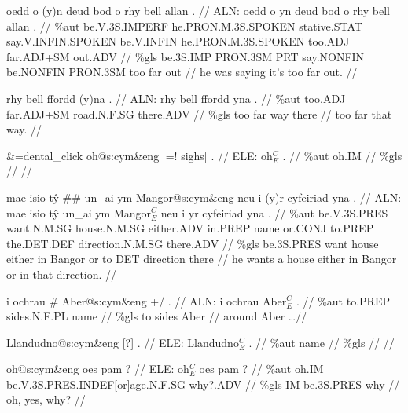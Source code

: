 \documentclass[a4paper,10pt]{article}
\begin{document}
\ex
\begingl[lingstyle=gergl]
\glchat oedd o (y)n deud bod o rhy bell allan . //
\glsurface ALN:  oedd o yn deud bod o rhy bell allan .  //
\glauto \%aut  be{\scriptsize .V.3S.IMPERF} he{\scriptsize .PRON.M.3S.SPOKEN} stative{\scriptsize .STAT} say{\scriptsize .V.INFIN.SPOKEN} be{\scriptsize .V.INFIN} he{\scriptsize .PRON.M.3S.SPOKEN} too{\scriptsize .ADJ} far{\scriptsize .ADJ+SM} out{\scriptsize .ADV}   //
\glmanual \%gls  be{\scriptsize .3S.IMP} PRON{\scriptsize .3SM} PRT say{\scriptsize .NONFIN} be{\scriptsize .NONFIN} PRON{\scriptsize .3SM} too far out   //
\gleng he was saying it's too far out. //
\endgl
\xe

\ex
\begingl[lingstyle=gergl]
\glchat rhy bell ffordd (y)na . //
\glsurface ALN:  rhy bell ffordd yna .  //
\glauto \%aut  too{\scriptsize .ADJ} far{\scriptsize .ADJ+SM} road{\scriptsize .N.F.SG} there{\scriptsize .ADV}   //
\glmanual \%gls  too far way there   //
\gleng too far that way. //
\endgl
\xe

\ex
\begingl[lingstyle=gergl]
\glchat \&=dental\_click oh@s:cym\&eng [=! sighs] . //
\glsurface ELE:  oh$^{C}_{E}$ .  //
\glauto \%aut  oh{\scriptsize .IM}   //
\glmanual \%gls     //
\gleng  //
\endgl
\xe

\ex
\begingl[lingstyle=gergl]
\glchat mae isio tŷ \#\# un\_ai ym Mangor@s:cym\&eng neu i (y)r cyfeiriad yna . //
\glsurface ALN:  mae isio tŷ un\_ai ym Mangor$^{C}_{E}$ neu i yr cyfeiriad yna .  //
\glauto \%aut  be{\scriptsize .V.3S.PRES} want{\scriptsize .N.M.SG} house{\scriptsize .N.M.SG} either{\scriptsize .ADV} in{\scriptsize .PREP} name or{\scriptsize .CONJ} to{\scriptsize .PREP} the{\scriptsize .DET.DEF} direction{\scriptsize .N.M.SG} there{\scriptsize .ADV}   //
\glmanual \%gls  be{\scriptsize .3S.PRES} want house either in Bangor or to DET direction there   //
\gleng he wants a house either in Bangor or in that direction. //
\endgl
\xe

\ex
\begingl[lingstyle=gergl]
\glchat i ochrau \# Aber@s:cym\&eng +/ . //
\glsurface ALN:  i ochrau Aber$^{C}_{E}$ .  //
\glauto \%aut  to{\scriptsize .PREP} sides{\scriptsize .N.F.PL} name   //
\glmanual \%gls  to sides Aber   //
\gleng around Aber \dots  //
\endgl
\xe

\ex
\begingl[lingstyle=gergl]
\glchat Llandudno@s:cym\&eng [?] . //
\glsurface ELE:  Llandudno$^{C}_{E}$ .  //
\glauto \%aut  name   //
\glmanual \%gls     //
\gleng  //
\endgl
\xe

\ex
\begingl[lingstyle=gergl]
\glchat oh@s:cym\&eng oes pam ? //
\glsurface ELE:  oh$^{C}_{E}$ oes pam ?  //
\glauto \%aut  oh{\scriptsize .IM} be{\scriptsize .V.3S.PRES.INDEF[or]age.N.F.SG} why?.ADV   //
\glmanual \%gls  IM be{\scriptsize .3S.PRES} why   //
\gleng oh, yes, why? //
\endgl
\xe
\end{document}
